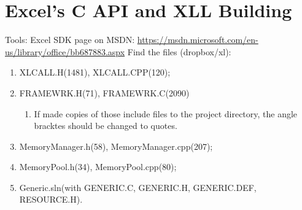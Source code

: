 \documentclass{article}
\numberwithin{equation}{subsection}
\begin{document}
	\section{Excel's C API and XLL Building}
	Tools: Excel SDK page on MSDN: \url{https://msdn.microsoft.com/en-us/library/office/bb687883.aspx}
	Find the files (dropbox/xl):
	\begin{enumerate}
		\item XLCALL.H(1481), XLCALL.CPP(120);
		\item FRAMEWRK.H(71), FRAMEWRK.C(2090)
		\begin{enumerate}
			\item If made copies of those include files to the project directory, the angle bracktes should be changed to quotes.
		\end{enumerate}
		\item MemoryManager.h(58), MemoryManager.cpp(207);
		\item MemoryPool.h(34), MemoryPool.cpp(80);
		\item Generic.sln(with GENERIC.C, GENERIC.H, GENERIC.DEF, RESOURCE.H).
	\end{enumerate}
\end{document}
